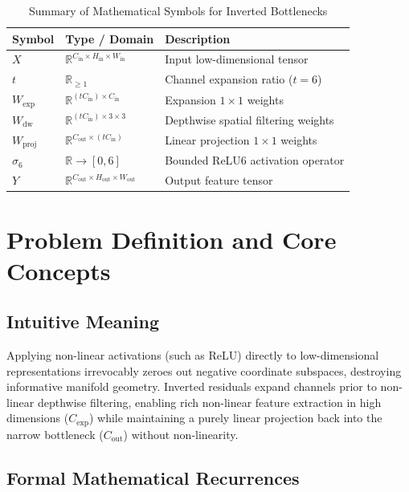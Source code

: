 \documentclass[11pt,a4paper]{article}
\theoremstyle{definition}
\begin{document}
\begin{table}[h]
\centering
\caption{Summary of Mathematical Symbols for Inverted Bottlenecks}
\begin{tabular}{lll}
\toprule
\textbf{Symbol} & \textbf{Type / Domain} & \textbf{Description} \\
\midrule
$X$ & $\mathbb{R}^{C_{\text{in}} \times H_{\text{in}} \times W_{\text{in}}}$ & Input low-dimensional tensor \\
$t$ & $\mathbb{R}_{\ge 1}$ & Channel expansion ratio ($t = 6$) \\
$W_{\text{exp}}$ & $\mathbb{R}^{(t C_{\text{in}}) \times C_{\text{in}}}$ & Expansion $1 \times 1$ weights \\
$W_{\text{dw}}$ & $\mathbb{R}^{(t C_{\text{in}}) \times 3 \times 3}$ & Depthwise spatial filtering weights \\
$W_{\text{proj}}$ & $\mathbb{R}^{C_{\text{out}} \times (t C_{\text{in}})}$ & Linear projection $1 \times 1$ weights \\
$\sigma_6$ & $\mathbb{R} \to [0, 6]$ & Bounded ReLU6 activation operator \\
$Y$ & $\mathbb{R}^{C_{\text{out}} \times H_{\text{out}} \times W_{\text{out}}}$ & Output feature tensor \\
\bottomrule
\end{tabular}
\end{table}

\section{Problem Definition and Core Concepts}

\subsection{Intuitive Meaning}
Applying non-linear activations (such as ReLU) directly to low-dimensional representations irrevocably zeroes out negative coordinate subspaces, destroying informative manifold geometry. Inverted residuals expand channels prior to non-linear depthwise filtering, enabling rich non-linear feature extraction in high dimensions ($C_{\text{exp}}$) while maintaining a purely linear projection back into the narrow bottleneck ($C_{\text{out}}$) without non-linearity.

\subsection{Formal Mathematical Recurrences}
\end{document}
